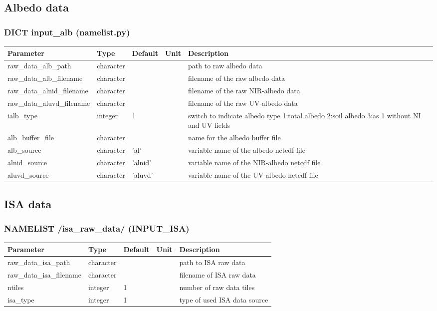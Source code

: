 \documentclass[a4paper,10pt,DIV14,BCOR1cm,titlepage,twoside]{scrartcl}
\providecommand{\tabularnewline}{\\}
\begin{document}
\subsection{Albedo data}\label{namelist_input_for_extpar_albedo}

\subsubsection*{DICT input\_alb (namelist.py)}

\begin{longtable}{|p{4cm}|p{1.5cm}|p{1.5cm}|p{1cm}|p{6cm}|}
\hline 
\textbf{Parameter}& \textbf{Type}& \textbf{Default}& \textbf{Unit}& \textbf{Description}
\tabularnewline
\hline
\endhead
\hline 
raw\_data\_alb\_path & character & & & path to raw albedo data
\tabularnewline
\hline
raw\_data\_alb\_filename & character & & & filename of the raw albedo data
\tabularnewline
\hline
raw\_data\_alnid\_filename & character & & & filename of the raw NIR-albedo data
\tabularnewline
\hline
raw\_data\_aluvd\_filename & character & & & filename of the raw UV-albedo data
\tabularnewline
\hline
ialb\_type & integer &1 & & switch to indicate albedo type 1:total albedo 2:soil albedo 3:as 1 without NI and UV fields
\tabularnewline
\hline
alb\_buffer\_file & character & & & name for the albedo buffer file
\tabularnewline
\hline
alb\_source & character & 'al' & & variable name of the albedo netcdf file
\tabularnewline
\hline
alnid\_source & character & 'alnid' & & variable name of the NIR-albedo netcdf file
\tabularnewline
\hline
aluvd\_source & character & 'aluvd' & & variable name of the UV-albedo netcdf file
\tabularnewline
\hline
\bottomrule
\end{longtable}

\subsection{ISA data}\label{namelist_input_for_extpar_isa}

\subsubsection*{NAMELIST /isa\_raw\_data/ (INPUT\_ISA)}

\begin{longtable}{|p{4cm}|p{1.5cm}|p{1.5cm}|p{1cm}|p{6cm}|}
\hline 
\textbf{Parameter}& \textbf{Type}& \textbf{Default}& \textbf{Unit}& \textbf{Description}
\tabularnewline
\hline
\endhead
\hline 
raw\_data\_isa\_path & character & &  & path to ISA raw data \tabularnewline
\hline 
raw\_data\_isa\_filename & character & &  & filename of ISA raw data \tabularnewline
\hline
ntiles & integer & 1 &  & number of raw data tiles \tabularnewline
\hline
isa\_type & integer & 1 &  & type of used ISA data source \tabularnewline
\hline
\bottomrule
\end{longtable}
\end{document}
